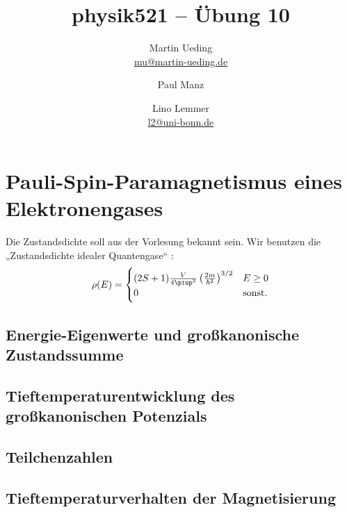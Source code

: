 

\title{physik521 – Übung 10}
\author{
	Martin Ueding \\ \small{\href{mailto:mu@martin-ueding.de}{mu@martin-ueding.de}}
        \and Paul Manz
        \and Lino Lemmer \\ \small{\href{mailto:l2@uni-bonn.de}{l2@uni-bonn.de}}
}

\pagestyle{plain}



\maketitle


\section{Pauli-Spin-Paramagnetismus eines Elektronengases}

Die Zustandsdichte soll aus der Vorlesung bekannt sein. Wir benutzen die
„Zustandsdichte idealer Quantengase“ \parencite[]{nolting-theo6}:
\[
    \rho(E) = \begin{cases}
        (2S + 1) \frac{V}{4\piup^2} \del{\frac{2m}{\hbar^2}}^{3/2} & E \geq 0 \\
        0 & \text{sonst}.
    \end{cases}
\]

\subsection{Energie-Eigenwerte und großkanonische Zustandssumme}

\fehlt

\subsection{Tieftemperaturentwicklung des großkanonischen Potenzials}

\fehlt

\subsection{Teilchenzahlen}

\fehlt

\subsection{Tieftemperaturverhalten der Magnetisierung}

